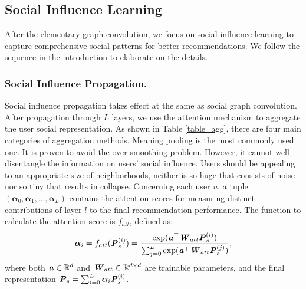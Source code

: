 \documentclass[letterpaper]{article} %
\begin{document}
\subsection{Social Influence Learning}
After the elementary graph convolution, we focus on social influence learning to capture comprehensive social patterns for better recommendations. We follow the sequence in the introduction to elaborate on the details.

\subsubsection{Social Influence Propagation.}
Social influence propagation takes effect at the same as social graph convolution. After propagation through $L$ layers, we use the attention mechanism \cite{attention} to aggregate the user social representation. As shown in Table \ref{table_agg}, there are four main categories of aggregation methods. Meaning pooling is the most commonly used one. It is proven to avoid the over-smoothing problem. However, it cannot well disentangle the information on users' social influence. Users should be appealing to an appropriate size of neighborhoods, neither is so huge that consists of noise nor so tiny that results in collapse. Concerning each user $u$, a tuple $(\boldsymbol{\alpha}_{0},\boldsymbol{\alpha}_{1},\ldots,\boldsymbol{\alpha}_{L})$ contains the attention scores for measuring distinct contributions of layer $l$ to the final recommendation performance. The function to calculate the attention score is $f_{att}$, defined as:
\begin{align}
    \boldsymbol{\alpha}_i = f_{att}(\textbf{\textit{P}}_{s}^{(i)}) = \frac{\exp(\textbf{\textit{a}}^{\top}\textbf{\textit{W}}_{att} \textbf{\textit{P}}^{(i)}_{s})}{\sum_{j=0}^{L}\exp(\textbf{\textit{a}}^{\top}\textbf{\textit{W}}_{att}\textbf{\textit{P}}^{(j)}_s)},
\end{align}
where both $\textbf{\textit{a}}\in \mathbb{R}^{d}$ and $\textbf{\textit{W}}_{att}\in \mathbb{R}^{d\times d}$ are trainable parameters, and the final representation $\textbf{\textit{P}}_s=\sum_{i=0}^{L}{\boldsymbol{\alpha}_i\textbf{\textit{P}}^{(i)}_s}$.
\end{document}
